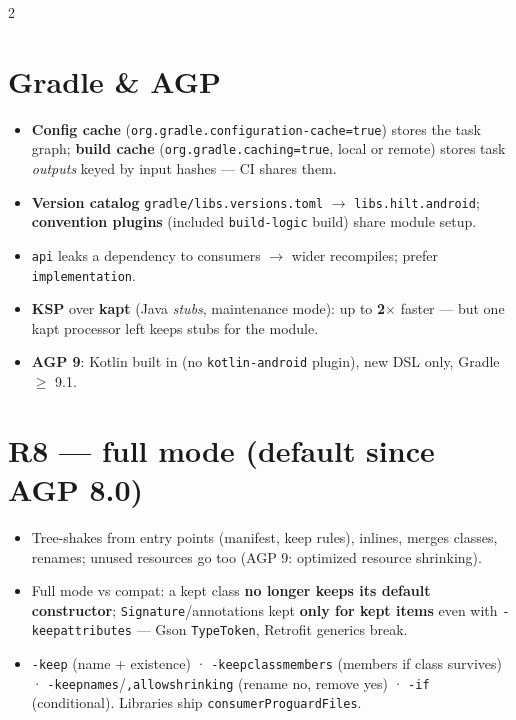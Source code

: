 \documentclass[8pt]{extarticle}
\begin{document}
\begin{multicols}{2}
\raggedright

\section{Gradle \& AGP}
\begin{itemize}\raggedright
  \item \textbf{Config cache} (\texttt{org.gradle.configuration-cache=true}) stores the task
        graph; \textbf{build cache} (\texttt{org.gradle.caching=true}, local or remote)
        stores task \emph{outputs} keyed by input hashes — CI shares them.
  \item \textbf{Version catalog} \texttt{gradle/libs.versions.toml} $\to$
        \texttt{libs.hilt.android}; \textbf{convention plugins} (included
        \texttt{build-logic} build) share module setup.
  \item \texttt{api} leaks a dependency to consumers $\to$ wider recompiles; prefer
        \texttt{implementation}.
  \item \textbf{KSP} over \textbf{kapt} (Java \emph{stubs}, maintenance mode): up to
        \textbf{2$\times$} faster — but one kapt processor left keeps stubs for the module.
  \item \textbf{AGP 9}: Kotlin built in (no \texttt{kotlin-android} plugin), new DSL only,
        Gradle $\geq$ 9.1.
\end{itemize}

\section{R8 — full mode (default since AGP 8.0)}
\begin{itemize}\raggedright
  \item Tree-shakes from entry points (manifest, keep rules), inlines, merges classes,
        renames; unused resources go too (AGP 9: optimized resource shrinking).
  \item Full mode vs compat: a kept class \textbf{no longer keeps its default constructor};
        \texttt{Signature}/annotations kept \textbf{only for kept items} even with
        \texttt{-keepattributes} — Gson \texttt{TypeToken}, Retrofit generics break.
  \item \texttt{-keep} (name + existence) · \texttt{-keepclassmembers} (members if class
        survives) · \texttt{-keepnames}/\texttt{,allowshrinking} (rename no, remove yes) ·
        \texttt{-if} (conditional). Libraries ship \texttt{consumerProguardFiles}.
\end{itemize}


\end{multicols}
\end{document}

